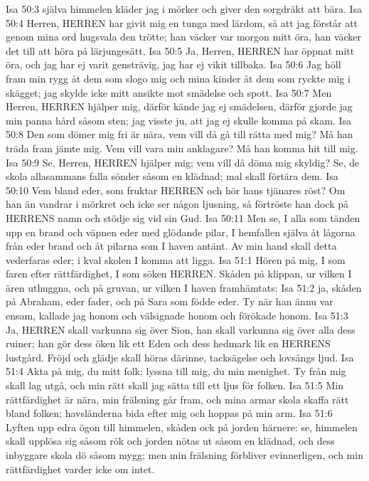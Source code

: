 Isa 50:3  själva himmelen kläder jag i mörker och giver den sorgdräkt att bära.
Isa 50:4  Herren, HERREN har givit mig en tunga med lärdom, så att jag förstår att genom mina ord hugsvala den trötte; han väcker var morgon mitt öra, han väcker det till att höra på lärjungesätt.
Isa 50:5  Ja, Herren, HERREN har öppnat mitt öra, och jag har ej varit gensträvig, jag har ej vikit tillbaka.
Isa 50:6  Jag höll fram min rygg åt dem som slogo mig och mina kinder åt dem som ryckte mig i skägget; jag skylde icke mitt ansikte mot smädelse och spott.
Isa 50:7  Men Herren, HERREN hjälper mig, därför kände jag ej smädelsen, därför gjorde jag min panna hård såsom sten; jag visste ju, att jag ej skulle komma på skam.
Isa 50:8  Den som dömer mig fri är nära, vem vill då gå till rätta med mig? Må han träda fram jämte mig. Vem vill vara min anklagare? Må han komma hit till mig.
Isa 50:9  Se, Herren, HERREN hjälper mig; vem vill då döma mig skyldig? Se, de skola allasammans falla sönder såsom en klädnad; mal skall förtära dem.
Isa 50:10  Vem bland eder, som fruktar HERREN och hör hans tjänares röst? Om han än vandrar i mörkret och icke ser någon ljusning, så förtröste han dock på HERRENS namn och stödje sig vid sin Gud.
Isa 50:11  Men se, I alla som tänden upp en brand och väpnen eder med glödande pilar, I hemfallen själva åt lågorna från eder brand och åt pilarna som I haven antänt. Av min hand skall detta vederfaras eder; i kval skolen I komma att ligga.
Isa 51:1  Hören på mig, I som faren efter rättfärdighet, I som söken HERREN. Skåden på klippan, ur vilken I ären uthuggna, och på gruvan, ur vilken I haven framhämtats:
Isa 51:2  ja, skåden på Abraham, eder fader, och på Sara som födde eder. Ty när han ännu var ensam, kallade jag honom och välsignade honom och förökade honom.
Isa 51:3  Ja, HERREN skall varkunna sig över Sion, han skall varkunna sig över alla dess ruiner; han gör dess öken lik ett Eden och dess hedmark lik en HERRENS lustgård. Fröjd och glädje skall höras därinne, tacksägelse och lovsångs ljud.
Isa 51:4  Akta på mig, du mitt folk; lyssna till mig, du min menighet. Ty från mig skall lag utgå, och min rätt skall jag sätta till ett ljus för folken.
Isa 51:5  Min rättfärdighet är nära, min frälsning går fram, och mina armar skola skaffa rätt bland folken; havsländerna bida efter mig och hoppas på min arm.
Isa 51:6  Lyften upp edra ögon till himmelen, skåden ock på jorden härnere: se, himmelen skall upplösa sig såsom rök och jorden nötas ut såsom en klädnad, och dess inbyggare skola dö såsom mygg; men min frälsning förbliver evinnerligen, och min rättfärdighet varder icke om intet.
